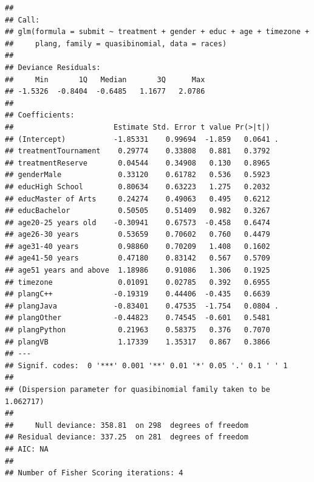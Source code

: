 \documentclass[12pt,]{article}
\theoremstyle{plain} %
\begin{document}
\begin{verbatim}
## 
## Call:
## glm(formula = submit ~ treatment + gender + educ + age + timezone + 
##     plang, family = quasibinomial, data = races)
## 
## Deviance Residuals: 
##     Min       1Q   Median       3Q      Max  
## -1.5326  -0.8404  -0.6485   1.1677   2.0786  
## 
## Coefficients:
##                       Estimate Std. Error t value Pr(>|t|)  
## (Intercept)           -1.85331    0.99694  -1.859   0.0641 .
## treatmentTournament    0.29774    0.33808   0.881   0.3792  
## treatmentReserve       0.04544    0.34908   0.130   0.8965  
## genderMale             0.33120    0.61782   0.536   0.5923  
## educHigh School        0.80634    0.63223   1.275   0.2032  
## educMaster of Arts     0.24274    0.49063   0.495   0.6212  
## educBachelor           0.50505    0.51409   0.982   0.3267  
## age20-25 years old    -0.30941    0.67573  -0.458   0.6474  
## age26-30 years         0.53659    0.70602   0.760   0.4479  
## age31-40 years         0.98860    0.70209   1.408   0.1602  
## age41-50 years         0.47180    0.83142   0.567   0.5709  
## age51 years and above  1.18986    0.91086   1.306   0.1925  
## timezone               0.01091    0.02785   0.392   0.6955  
## plangC++              -0.19319    0.44406  -0.435   0.6639  
## plangJava             -0.83401    0.47535  -1.754   0.0804 .
## plangOther            -0.44823    0.74545  -0.601   0.5481  
## plangPython            0.21963    0.58375   0.376   0.7070  
## plangVB                1.17339    1.35317   0.867   0.3866  
## ---
## Signif. codes:  0 '***' 0.001 '**' 0.01 '*' 0.05 '.' 0.1 ' ' 1
## 
## (Dispersion parameter for quasibinomial family taken to be 1.062717)
## 
##     Null deviance: 358.81  on 298  degrees of freedom
## Residual deviance: 337.25  on 281  degrees of freedom
## AIC: NA
## 
## Number of Fisher Scoring iterations: 4
\end{verbatim}
\end{document}
